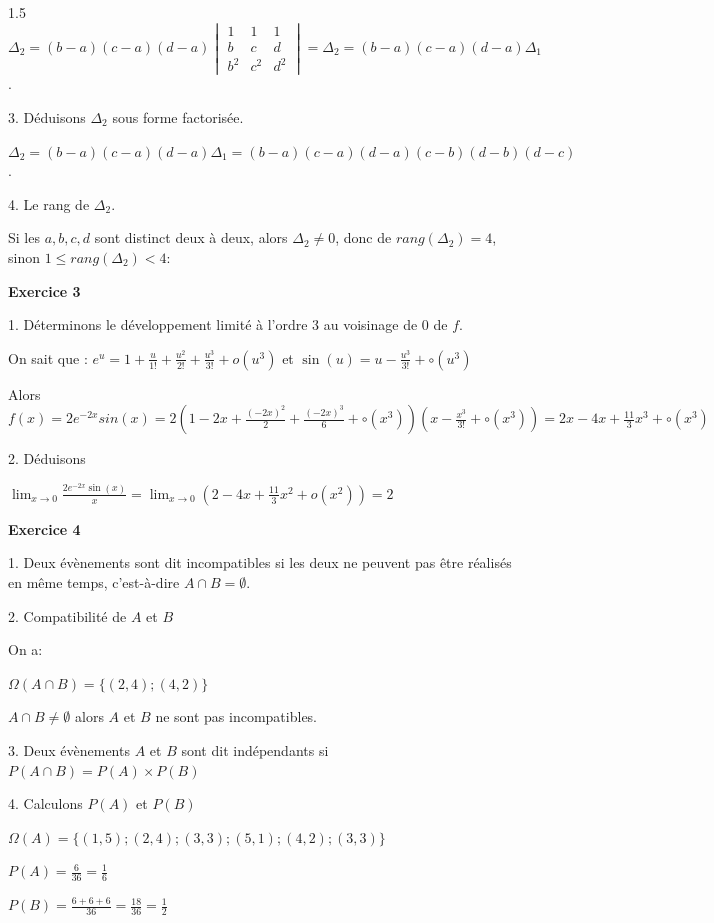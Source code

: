 \documentclass[12pt]{article}
\begin{document}
\begin{spacing}{1.5}
$\Delta_2=(b-a)(c-a)(d-a)\begin{vmatrix}
1 & 1 & 1 \\ 
b & c & d \\ 
b^2 & c^2 & d^2
\end{vmatrix}=\Delta_2 =(b-a)(c-a)(d-a)\Delta_1$.

3. Déduisons $\Delta_2$ sous forme factorisée.  

$\Delta_2 =(b-a)(c-a)(d-a)\Delta_1=(b-a)(c-a)(d-a)(c-b)(d-b)(d-c)$.

4. Le rang de $\Delta_2$.

Si les $a,b,c,d$ sont distinct deux à deux, alors $\Delta_2\neq 0$, donc de $rang(\Delta_2)=4$, sinon  $1\leq rang(\Delta_2)<4$:


 
 
 
\medskip\textbf{Exercice 3}

1. Déterminons le développement limité à l'ordre 3 au voisinage de 0 de $f$.
 
 On sait que : $e^u=1+\frac{u}{1!}+\frac{u^2}{2!}+\frac{u^3}{3!}+o(u^3)$ et $\sin(u)=u-\frac{u^3}{3!}+\circ(u^3)$ 
 
 Alors $f(x) = 2e^{-2x}sin(x)=2(1-2x+\frac{(-2x)^2}{2}+\frac{(-2x)^3}{6} +\circ(x^3))(x-\frac{x^3}{3!}+\circ(x^3))=2x-4x+\frac{11}{3}x^3+\circ(x^3)$
 
 2. Déduisons

$\lim_{x \to 0} \frac{2e^{-2x} \sin(x)}{x} = \lim_{x \to 0} \left( 2 - 4x + \frac{11}{3}x^2 + o(x^2) \right) = 2$

\medskip\textbf{Exercice 4}

1. Deux évènements sont dit incompatibles si les deux ne peuvent pas être réalisés en même temps, c'est-à-dire $A\cap B = \emptyset$.

2. Compatibilité de $A$ et $B$

On a:

 $\Omega(A\cap B)=\{(2,4);(4,2)\}$

 $A\cap B \neq \emptyset$ alors $A$ et $B$ ne sont pas incompatibles.
 
 3. Deux évènements $A$ et $B$ sont dit indépendants si $P(A\cap B)=P(A)\times P(B)$
 
 4. Calculons $P(A)$ et $P(B)$

$\Omega(A)=\{(1,5);(2,4);(3,3);(5,1);(4,2);(3,3)\}$

$P(A)=\frac{6}{36}=\frac{1}{6}$

$P(B)=\frac{6+6+6}{36}=\frac{18}{36}=\frac{1}{2}$


\end{spacing}
\end{document}
